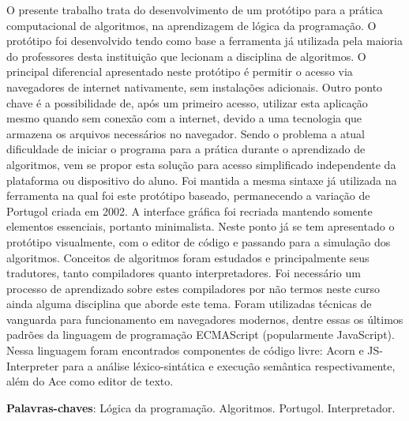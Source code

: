 \begin{resumo}
O presente trabalho trata do desenvolvimento de um protótipo para a prática computacional de algoritmos, na aprendizagem de lógica da programação. O protótipo foi desenvolvido tendo como base a ferramenta já utilizada pela maioria do professores desta instituição que lecionam a disciplina de algoritmos. O principal diferencial apresentado neste protótipo é permitir o acesso via navegadores de internet nativamente, sem instalações adicionais. Outro ponto chave é a possibilidade de, após um primeiro acesso, utilizar esta aplicação mesmo quando sem conexão com a internet, devido a uma tecnologia que armazena os arquivos necessários no navegador. Sendo o problema a atual dificuldade de iniciar o programa para a prática durante o aprendizado de algoritmos, vem se propor esta solução para acesso simplificado independente da plataforma ou dispositivo do aluno. Foi mantida a mesma sintaxe já utilizada na ferramenta na qual foi este protótipo baseado, permanecendo a variação de Portugol criada em 2002. A interface gráfica foi recriada mantendo somente elementos essenciais, portanto minimalista. Neste ponto já se tem apresentado o protótipo visualmente, com o editor de código e passando para a simulação dos algoritmos. Conceitos de algoritmos foram estudados e principalmente seus tradutores, tanto compiladores quanto interpretadores. Foi necessário um processo de aprendizado sobre estes compiladores por não termos neste curso ainda alguma disciplina que aborde este tema. Foram utilizadas técnicas de vanguarda para funcionamento em navegadores modernos, dentre essas os últimos padrões da linguagem de programação ECMAScript (popularmente JavaScript). Nessa linguagem foram encontrados componentes de código livre: Acorn e JS-Interpreter para a análise léxico-sintática e execução semântica respectivamente, além do Ace como editor de texto.

\vspace{\onelineskip}
\textbf{Palavras-chaves}: Lógica da programação. Algoritmos. Portugol. Interpretador.
\end{resumo}

%

